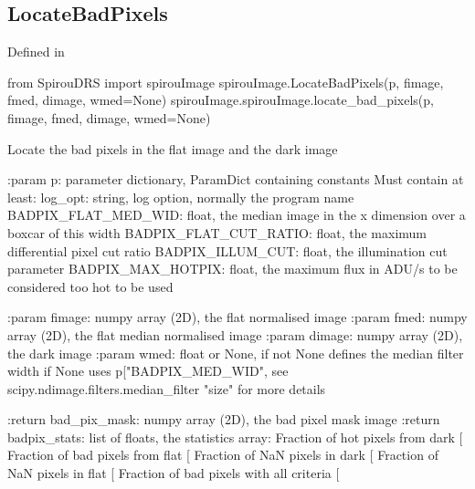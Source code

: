 \noindent\begin{minipage}{\textwidth}
\subsection{LocateBadPixels}

Defined in \spirouImage{}

\begin{pythonbox}
from SpirouDRS import spirouImage
spirouImage.LocateBadPixels(p, fimage, fmed, dimage, wmed=None)
spirouImage.spirouImage.locate_bad_pixels(p, fimage, fmed, dimage, wmed=None)
\end{pythonbox}

\begin{pythondocstring}
Locate the bad pixels in the flat image and the dark image

:param p: parameter dictionary, ParamDict containing constants
    Must contain at least:
            log_opt: string, log option, normally the program name
            BADPIX_FLAT_MED_WID: float, the median image in the x
                                 dimension over a boxcar of this width
            BADPIX_FLAT_CUT_RATIO: float, the maximum differential pixel
                                   cut ratio
            BADPIX_ILLUM_CUT: float, the illumination cut parameter
            BADPIX_MAX_HOTPIX: float, the maximum flux in ADU/s to be
                               considered too hot to be used

:param fimage: numpy array (2D), the flat normalised image
:param fmed: numpy array (2D), the flat median normalised image
:param dimage: numpy array (2D), the dark image
:param wmed: float or None, if not None defines the median filter width
             if None uses p["BADPIX_MED_WID", see
             scipy.ndimage.filters.median_filter "size" for more details

:return bad_pix_mask: numpy array (2D), the bad pixel mask image
:return badpix_stats: list of floats, the statistics array:
                        Fraction of hot pixels from dark [%
                        Fraction of bad pixels from flat [%
                        Fraction of NaN pixels in dark [%
                        Fraction of NaN pixels in flat [%
                        Fraction of bad pixels with all criteria [%
\end{pythondocstring}
\end{minipage}


